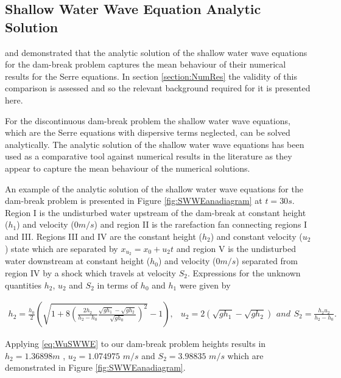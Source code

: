 \documentclass[times]{elsarticle}
\begin{document}
\subsection{Shallow Water Wave Equation Analytic Solution}
\citet{Hank-etal-2010-2034} and \citet{Mitsotakis-etal-2014} demonstrated that the analytic solution of the shallow water wave equations for the dam-break problem captures the mean behaviour of their numerical results for the Serre equations. In section \ref{section:NumRes} the validity of this comparison is assessed and so the relevant background required for it is presented here.

For the discontinuous dam-break problem the shallow water wave equations, which are the Serre equations with dispersive terms neglected, can be solved analytically. The analytic solution of the shallow water wave equations has been used as a comparative tool against numerical results in the literature \cite{Hank-etal-2010-2034,Mitsotakis-etal-2014} as they appear to capture the mean behaviour of the numerical solutions. 

An example of the analytic solution of the shallow water wave equations for the dam-break problem is presented in Figure \ref{fig:SWWEanadiagram} at $t=30s$. Region I is the undisturbed water upstream of the dam-break at constant height ($h_1$) and velocity ($0m/s$) and region II is the rarefaction fan connecting regions I and III. Regions III and IV are the constant height ($h_2$) and constant velocity ($u_2$) state which are separated by $x_{u_2} = x_0 + u_2t$ and region V is the undisturbed water downstream at constant height ($h_0$) and velocity ($0m/s$) separated from region IV by a shock which travels at velocity $S_2$. Expressions for the unknown quantities $h_2$, $u_2$ and $S_2$ in terms of $h_0$ and $h_1$ were given by \citet{Wu-etal-1999-1210}
\begin{linenomath*}
\begin{subequations}
\begin{gather}
h_2 = \frac{h_0}{2} \left(\sqrt{1 + 8 \left(\frac{2h_2}{h_2 - h_0}\frac{\sqrt{gh_1} - \sqrt{gh_2}}{\sqrt{gh_0}}\right)^2} - 1\right),
\end{gather}
	\begin{gather}
	u_2 = 2\left(\sqrt{gh_1} - \sqrt{gh_2}\right)
	\end{gather}
and
	\begin{gather}
	S_2 = \frac{h_2 u_2}{h_2 - h_0}.
	\end{gather}
\label{eq:WuSWWE}	
\end{subequations}
\end{linenomath*}
Applying \eqref{eq:WuSWWE} to our dam-break problem heights results in $h_2 = 1.36898m$ , $u_2 = 1.074975$ $m/s$ and $S_2 = 3.98835$ $m/s$ which are demonstrated in Figure \ref{fig:SWWEanadiagram}.
\end{document}
